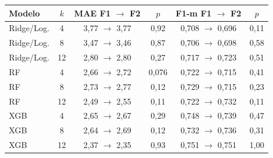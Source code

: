 \begin{tabular}{@{}lccccc@{}}
\toprule
Modelo & $k$ & MAE F1 $\rightarrow$ F2 & $p$ & F1-m F1 $\rightarrow$ F2 & $p$ \\
\midrule
Ridge/Log. & 4 & 3,77 $\rightarrow$ 3,77 & 0,92 & 0,708 $\rightarrow$ 0,696 & 0,11 \\
Ridge/Log. & 8 & 3,47 $\rightarrow$ 3,46 & 0,87 & 0,706 $\rightarrow$ 0,698 & 0,58 \\
Ridge/Log. & 12 & 2,80 $\rightarrow$ 2,80 & 0,27 & 0,717 $\rightarrow$ 0,723 & 0,51 \\
RF & 4 & 2,66 $\rightarrow$ 2,72 & 0,076 & 0,722 $\rightarrow$ 0,715 & 0,41 \\
RF & 8 & 2,73 $\rightarrow$ 2,77 & 0,12 & 0,729 $\rightarrow$ 0,715 & 0,23 \\
RF & 12 & 2,49 $\rightarrow$ 2,55 & 0,11 & 0,722 $\rightarrow$ 0,732 & 0,11 \\
XGB & 4 & 2,65 $\rightarrow$ 2,67 & 0,29 & 0,748 $\rightarrow$ 0,739 & 0,47 \\
XGB & 8 & 2,64 $\rightarrow$ 2,69 & 0,12 & 0,732 $\rightarrow$ 0,736 & 0,31 \\
XGB & 12 & 2,37 $\rightarrow$ 2,35 & 0,93 & 0,751 $\rightarrow$ 0,751 & 1,00 \\
\bottomrule
\end{tabular}
